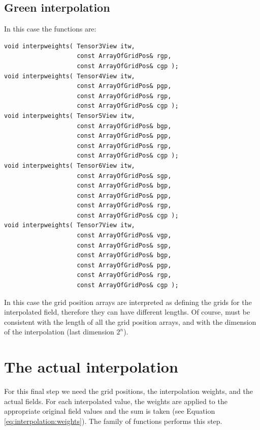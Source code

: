 \subsection{Green interpolation}

In this case the functions are:

{\small
\begin{verbatim}
void interpweights( Tensor3View itw,
                    const ArrayOfGridPos& rgp,
                    const ArrayOfGridPos& cgp );
void interpweights( Tensor4View itw,
                    const ArrayOfGridPos& pgp,
                    const ArrayOfGridPos& rgp,
                    const ArrayOfGridPos& cgp );
void interpweights( Tensor5View itw,
                    const ArrayOfGridPos& bgp,
                    const ArrayOfGridPos& pgp,
                    const ArrayOfGridPos& rgp,
                    const ArrayOfGridPos& cgp );
void interpweights( Tensor6View itw,
                    const ArrayOfGridPos& sgp,
                    const ArrayOfGridPos& bgp,
                    const ArrayOfGridPos& pgp,
                    const ArrayOfGridPos& rgp,
                    const ArrayOfGridPos& cgp );
void interpweights( Tensor7View itw,
                    const ArrayOfGridPos& vgp,
                    const ArrayOfGridPos& sgp,
                    const ArrayOfGridPos& bgp,
                    const ArrayOfGridPos& pgp,
                    const ArrayOfGridPos& rgp,
                    const ArrayOfGridPos& cgp );
\end{verbatim}
}

In this case the grid position arrays are interpreted as defining the
grids for the interpolated field, therefore they can have different
lengths. Of course,  must be consistent with the length of
all the grid position arrays, and with the dimension of the
interpolation (last dimension $2^n$).

\section{The actual interpolation}

For this final step we need the grid positions, the
interpolation weights, and the actual fields. For each interpolated
value, the weights are applied to the appropriate original field values
and the sum is taken (see Equation
\ref{eq:interpolation:weights}). The  family of functions
performs this step.

